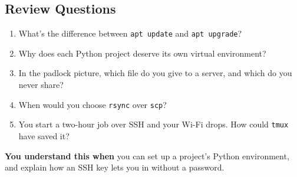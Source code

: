 \subsection*{Review Questions}\label{07-installing-software-and-working-remotely:review-questions}

\begin{enumerate}
\def\labelenumi{\arabic{enumi}.}
\tightlist
\item
  What's the difference between \texttt{apt\ update} and \texttt{apt\ upgrade}?
\item
  Why does each Python project deserve its own virtual environment?
\item
  In the padlock picture, which file do you give to a server, and which do you never share?
\item
  When would you choose \texttt{rsync} over \texttt{scp}?
\item
  You start a two-hour job over SSH and your Wi-Fi drops. How could \texttt{tmux} have saved it?
\end{enumerate}

\begin{understandbox}

\textbf{You understand this when} you can set up a project's Python environment, and explain how an SSH key lets you in without a password.

\end{understandbox}

